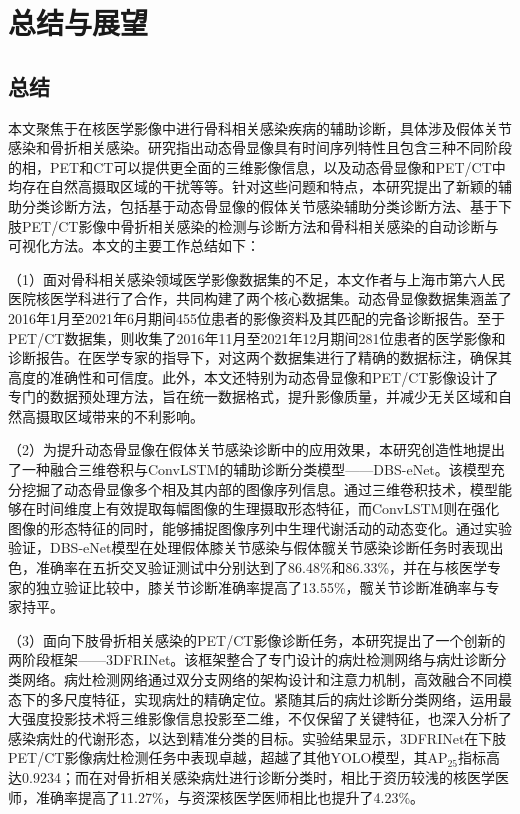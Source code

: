 \chapter{总结与展望}

\section{总结}

本文聚焦于在核医学影像中进行骨科相关感染疾病的辅助诊断，具体涉及假体关节感染和骨折相关感染。研究指出动态骨显像具有时间序列特性且包含三种不同阶段的相，PET和CT可以提供更全面的三维影像信息，以及动态骨显像和PET/CT中均存在自然高摄取区域的干扰等等。针对这些问题和特点，本研究提出了新颖的辅助分类诊断方法，包括基于动态骨显像的假体关节感染辅助分类诊断方法、基于下肢PET/CT影像中骨折相关感染的检测与诊断方法和骨科相关感染的自动诊断与可视化方法。本文的主要工作总结如下：

（1）面对骨科相关感染领域医学影像数据集的不足，本文作者与上海市第六人民医院核医学科进行了合作，共同构建了两个核心数据集。动态骨显像数据集涵盖了2016年1月至2021年6月期间455位患者的影像资料及其匹配的完备诊断报告。至于PET/CT数据集，则收集了2016年11月至2021年12月期间281位患者的医学影像和诊断报告。在医学专家的指导下，对这两个数据集进行了精确的数据标注，确保其高度的准确性和可信度。此外，本文还特别为动态骨显像和PET/CT影像设计了专门的数据预处理方法，旨在统一数据格式，提升影像质量，并减少无关区域和自然高摄取区域带来的不利影响。

（2）为提升动态骨显像在假体关节感染诊断中的应用效果，本研究创造性地提出了一种融合三维卷积与ConvLSTM的辅助诊断分类模型——DBS-eNet。该模型充分挖掘了动态骨显像多个相及其内部的图像序列信息。通过三维卷积技术，模型能够在时间维度上有效提取每幅图像的生理摄取形态特征，而ConvLSTM则在强化图像的形态特征的同时，能够捕捉图像序列中生理代谢活动的动态变化。通过实验验证，DBS-eNet模型在处理假体膝关节感染与假体髋关节感染诊断任务时表现出色，准确率在五折交叉验证测试中分别达到了86.48\%和86.33\%，并在与核医学专家的独立验证比较中，膝关节诊断准确率提高了13.55\%，髋关节诊断准确率与专家持平。

（3）面向下肢骨折相关感染的PET/CT影像诊断任务，本研究提出了一个创新的两阶段框架——3DFRINet。该框架整合了专门设计的病灶检测网络与病灶诊断分类网络。病灶检测网络通过双分支网络的架构设计和注意力机制，高效融合不同模态下的多尺度特征，实现病灶的精确定位。紧随其后的病灶诊断分类网络，运用最大强度投影技术将三维影像信息投影至二维，不仅保留了关键特征，也深入分析了感染病灶的代谢形态，以达到精准分类的目标。实验结果显示，3DFRINet在下肢PET/CT影像病灶检测任务中表现卓越，超越了其他YOLO模型，其AP\(_{25}\)指标高达0.9234；而在对骨折相关感染病灶进行诊断分类时，相比于资历较浅的核医学医师，准确率提高了11.27\%，与资深核医学医师相比也提升了4.23\%。

